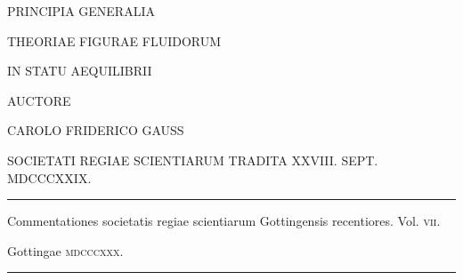 \clearpage
\thispagestyle{empty}
\begin{center}
\vspace*{.7in}
{\large PRINCIPIA GENERALIA\par}
\bigskip
{\Large THEORIAE FIGURAE FLUIDORUM\par}
\bigskip
{\Large IN STATU AEQUILIBRII\par}
\vspace{.6in}
{\small AUCTORE\par}
\bigskip
CAROLO FRIDERICO GAUSS\par
\bigskip
{\small SOCIETATI REGIAE SCIENTIARUM TRADITA XXVIII. SEPT. MDCCCXXIX.\par}
\vfill
\rule{.8\textwidth}{.3pt}\par
\medskip
{\small Commentationes societatis regiae scientiarum Gottingensis recentiores. Vol. \textsc{vii}.\par}
Gottingae \textsc{mdcccxxx}.\par
\medskip
\rule{.8\textwidth}{.3pt}\par
\end{center}
\clearpage
